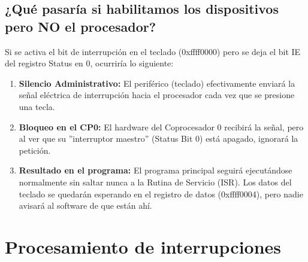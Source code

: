 \documentclass[]{article}
\begin{document}
	\subsection{¿Qué pasaría si habilitamos los dispositivos pero NO el procesador?}
		Si se activa el bit de interrupción en el teclado (0xffff0000) pero se deja el bit IE del registro Status en 0, ocurriría lo siguiente:
		\begin{enumerate}
			\item \textbf{Silencio Administrativo:} El periférico (teclado) efectivamente enviará la señal eléctrica de interrupción hacia el procesador cada vez que se presione una tecla.
			\item \textbf{Bloqueo en el CP0:} El hardware del Coprocesador 0 recibirá la señal, pero al ver que su ''interruptor maestro'' (Status Bit 0) está apagado, ignorará la petición.
			\item \textbf{Resultado en el programa:} El programa principal seguirá ejecutándose normalmente sin saltar nunca a la Rutina de Servicio (ISR). Los datos del teclado se quedarán esperando en el registro de datos (0xffff0004), pero nadie avisará al software de que están ahí.
		\end{enumerate}
		
\section{Procesamiento de interrupciones}
\end{document}
